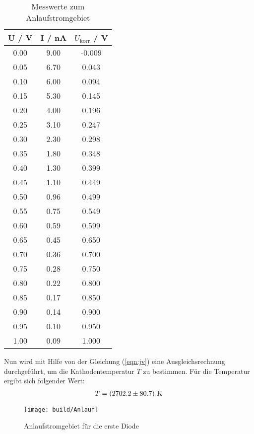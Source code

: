 \begin{table}[H] %
  \centering
  \begin{tabular}{c | c | c}
    \toprule
    U / V & I / nA & $U_\text{korr}$ / V \\
    \midrule
    0.00 & 9.00 &-0.009 \\
    0.05 & 6.70 & 0.043 \\
    0.10 & 6.00 & 0.094 \\
    0.15 & 5.30 & 0.145 \\
    0.20 & 4.00 & 0.196 \\
    0.25 & 3.10 & 0.247 \\
    0.30 & 2.30 & 0.298 \\
    0.35 & 1.80 & 0.348 \\
    0.40 & 1.30 & 0.399 \\
    0.45 & 1.10 & 0.449 \\
    0.50 & 0.96 & 0.499 \\
    0.55 & 0.75 & 0.549 \\
    0.60 & 0.59 & 0.599 \\
    0.65 & 0.45 & 0.650 \\
    0.70 & 0.36 & 0.700 \\
    0.75 & 0.28 & 0.750 \\
    0.80 & 0.22 & 0.800 \\
    0.85 & 0.17 & 0.850 \\
    0.90 & 0.14 & 0.900 \\
    0.95 & 0.10 & 0.950 \\
    1.00 & 0.09 & 1.000 \\
    \bottomrule
  \end{tabular}
  \caption{Messwerte zum Anlaufstromgebiet}
  \label{tab:Messdaten2}
\end{table}

Nun wird mit Hilfe von der Gleichung (\ref{eqn:jv}) eine Ausgleichsrechnung durchgeführt, um die Kathodentemperatur $T$ zu bestimmen. Für die Temperatur ergibt sich folgender Wert:
\begin{align*}
  T = (\num{2702.2 +- 80.7}) \ \text{K}
\end{align*}

\begin{figure}[H]
  \centering
  \texttt{[image: build/Anlauf]}
  \caption{Anlaufstromgebiet für die erste Diode}
  \label{fig:anlauf}
\end{figure}

